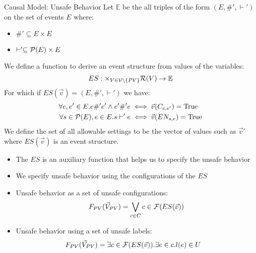 \begin{frame}{Causal Model: Unsafe Behavior}
    Let $\mathbb{E}$ be the all triples of the form
    $(E,\#',\vdash')$ on the set of events $E$ where:
    \begin{itemize}
        \item  $\#' \subseteq E \times E$
        \item $\vdash' \subseteq \mathcal{P}(E) \times E$
    \end{itemize}
    \vspace{\baselineskip}
    We define a function to derive an event structure from values of the variables:
    \begin{equation*}
      ES: \times_{V \in \mathcal{V}\setminus \{PV\}} \mathcal{R}(V) \rightarrow \mathbb{E}  
    \end{equation*}
    For which if $ES(\vec v) = (E,\#',\vdash')$ we have:
    \begin{align*}
        \forall e,e' \in E. e \#' e' \wedge e' \#' e
         & \iff \vec{v}(C_{e,e'}) = \mathrm{True} \\
        \forall s \in \mathcal{P}(E), e \in E.  s \vdash' e
         & \iff \vec{v}(EN_{s,e}) = \mathrm{True}
    \end{align*}
    We define the set of all allowable settings to be the vector of
    values such as $\vec v'$ where $ES(\vec v)$ is an
    event structure.
\end{frame}

\begin{frame}
    \begin{itemize}
        \item The $ES$ is an auxiliary function that helps us to specify the 
    unsafe behavior
        \item We specify unsafe behavior using the configurations of the $ES$
        \item Unsafe behavior as a set of unsafe configurations:
        \begin{equation*}
            \label{eq:unsafe}
            F_{PV}(\vec V_{PV}) = \bigvee_{c \in C} c \in \mathcal{F}(ES(\vec v))
        \end{equation*}
        \item Unsafe behavior using a set of unsafe labels:
        \begin{align*}
            F_{PV}(\vec V_{PV}) & = \exists c \in \mathcal{F}(ES(\vec v)).\exists e \in c.
            l(e) \in U
        \end{align*}
    \end{itemize}
\end{frame}
